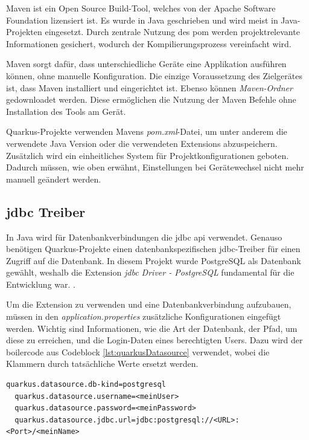 Maven ist ein Open Source Build-Tool, welches von der Apache Software Foundation lizensiert ist.
Es wurde in Java geschrieben und wird meist in Java-Projekten eingesetzt. 
Durch zentrale Nutzung des \gls{pom} werden projektrelevante Informationen gesichert, wodurch der Kompilierungsprozess vereinfacht wird.
\cite{MavenAbout, MavenAbout2gls}

Maven sorgt dafür, dass unterschiedliche Geräte eine Applikation ausführen können, ohne manuelle Konfiguration. 
Die einzige Voraussetzung  des Zielgerätes ist, dass Maven installiert und eingerichtet ist. 
Ebenso können \emph{Maven-Ordner} gedownloadet werden. 
Diese ermöglichen die Nutzung der Maven Befehle ohne Installation des Tools am Gerät.
\cite{MavenAbout, MavenAbout2gls}

Quarkus-Projekte verwenden Mavens \emph{pom.xml}-Datei, um unter anderem die verwendete Java Version oder die verwendeten Extensions abzuspeichern.
Zusätzlich wird ein einheitliches System für Projektkonfigurationen geboten. 
Dadurch müssen, wie oben erwähnt, Einstellungen bei Gerätewechsel nicht mehr manuell geändert werden. 
\cite{MavenAbout}

\subsection{\gls*{jdbc} Treiber}

In Java wird für Datenbankverbindungen die \gls{jdbc} \gls{api} verwendet. 
Genauso benötigen Quarkus-Projekte einen datenbankspezifischen \gls{jdbc}-Treiber für einen Zugriff auf die Datenbank. 
In diesem Projekt wurde PostgreSQL als Datenbank gewählt, weshalb die Extension \emph{\gls{jdbc} Driver - PostgreSQL} fundamental für die Entwicklung war. 
\cite{datasourcesAbout}.

Um die Extension zu verwenden und eine Datenbankverbindung aufzubauen, müssen in den \emph{application.properties} zusätzliche Konfigurationen eingefügt werden. 
Wichtig sind Informationen, wie die Art der Datenbank, der Pfad, um diese zu erreichen, und die Login-Daten eines berechtigten Users.
Dazu wird der \gls{boilercode} aus Codeblock \ref{lst:quarkusDatasource} verwendet, wobei die Klammern durch tatsächliche Werte ersetzt werden. 
\cite{datasourcesAbout}

\begin{lstlisting}[caption=Beispielkonfigurationen,label=lst:quarkusDatasource]
  quarkus.datasource.db-kind=postgresql 
  quarkus.datasource.username=<meinUser>
  quarkus.datasource.password=<meinPassword>
  quarkus.datasource.jdbc.url=jdbc:postgresql://<URL>:<Port>/<meinName>
\end{lstlisting}

